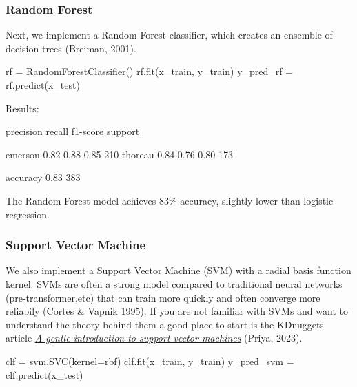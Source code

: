 \documentclass[
]{article}
\newenvironment{Shaded}{}{}
\newcommand{\NormalTok}[1]{#1}
\newcommand{\OperatorTok}[1]{\textcolor[rgb]{0.40,0.40,0.40}{#1}}
\newcommand{\StringTok}[1]{\textcolor[rgb]{0.25,0.44,0.63}{#1}}
\begin{document}
\subsubsection{Random Forest}\label{random-forest}

Next, we implement a Random Forest classifier, which creates an ensemble
of decision trees (Breiman, 2001).

\begin{Shaded}
\begin{Highlighting}[]
\NormalTok{rf }\OperatorTok{=}\NormalTok{ RandomForestClassifier()}
\NormalTok{rf.fit(x\_train, y\_train)}
\NormalTok{y\_pred\_rf }\OperatorTok{=}\NormalTok{ rf.predict(x\_test)}
\end{Highlighting}
\end{Shaded}

Results:

\begin{Shaded}
\begin{Highlighting}[]
\NormalTok{precision    recall  f1{-}score   support}

\NormalTok{emerson       0.82      0.88      0.85       210}
\NormalTok{thoreau       0.84      0.76      0.80       173}

\NormalTok{accuracy                          0.83       383}
\end{Highlighting}
\end{Shaded}

The Random Forest model achieves 83\% accuracy, slightly lower than
logistic regression.

\subsubsection{Support Vector Machine}\label{support-vector-machine}

We also implement a
\href{https://en.wikipedia.org/wiki/Support_vector_machine}{Support
Vector Machine} (SVM) with a radial basis function kernel.
SVM\textquotesingle s are often a strong model compared to traditional
neural networks (pre-transformer,etc) that can train more quickly and
often converge more reliabily (Cortes \& Vapnik 1995). If you are not
familiar with SVMs and want to understand the theory behind them a good
place to start is the KDnuggets article
\href{https://www.kdnuggets.com/2023/07/gentle-introduction-support-vector-machines.html}{\emph{A
gentle introduction to support vector machines}} (Priya, 2023).

\begin{Shaded}
\begin{Highlighting}[]
\NormalTok{clf }\OperatorTok{=}\NormalTok{ svm.SVC(kernel}\OperatorTok{=}\StringTok{\textquotesingle{}rbf\textquotesingle{}}\NormalTok{)}
\NormalTok{clf.fit(x\_train, y\_train)}
\NormalTok{y\_pred\_svm }\OperatorTok{=}\NormalTok{ clf.predict(x\_test)}
\end{Highlighting}
\end{Shaded}
\end{document}
